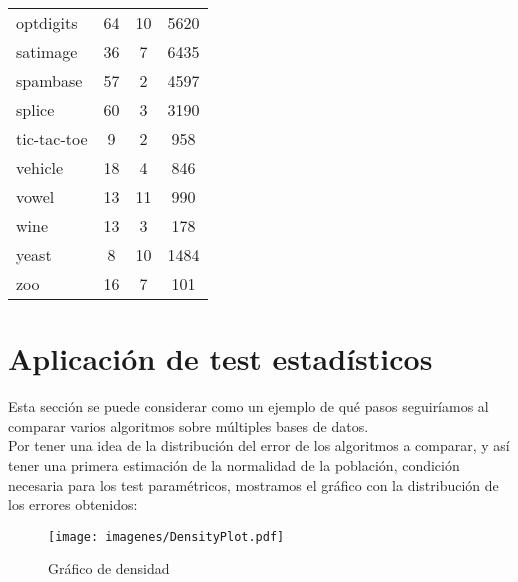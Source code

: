 \begin{table}[]
\begin{tabular}{@{}lccc@{}}
optdigits         & 64                  & 10               & 5620                 \\
satimage          & 36                  & 7                & 6435                 \\
spambase          & 57                  & 2                & 4597                 \\
splice            & 60                  & 3                & 3190                 \\
tic-tac-toe       & 9                   & 2                & 958                  \\
vehicle           & 18                  & 4                & 846                  \\
vowel             & 13                  & 11               & 990                  \\
wine              & 13                  & 3                & 178                  \\
yeast             & 8                   & 10               & 1484                 \\
zoo               & 16                  & 7                & 101                  \\ \bottomrule
\end{tabular}
\end{table}

\section{Aplicación de test estadísticos}

	Esta sección se puede considerar como un ejemplo de qué
pasos seguiríamos al comparar varios algoritmos sobre
múltiples bases de datos.\\
	Por tener una idea de la distribución del error de los 
algoritmos a comparar, y así tener una primera estimación
de la normalidad de la población, condición necesaria para
los test paramétricos, mostramos el gráfico con la 
distribución de los errores obtenidos:

\begin{figure}[H]
\centering
\label{fig:densplot}
\caption{Gráfico de densidad}
\texttt{[image: imagenes/DensityPlot.pdf]}
\end{figure}

